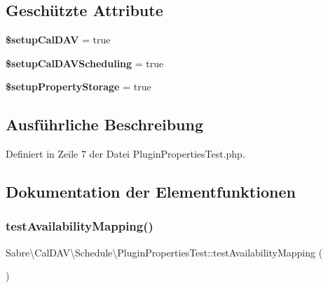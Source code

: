 \subsection*{Geschützte Attribute}
\begin{DoxyCompactItemize}
\item 
\mbox{\label{class_sabre_1_1_cal_d_a_v_1_1_schedule_1_1_plugin_properties_test_a51eddfe2a0409e71af29e128dad1fa5b}} 
{\bfseries \$setup\+Cal\+D\+AV} = true
\item 
\mbox{\label{class_sabre_1_1_cal_d_a_v_1_1_schedule_1_1_plugin_properties_test_aa7ab9b28515e3b29f2eab1a0b3331f0e}} 
{\bfseries \$setup\+Cal\+D\+A\+V\+Scheduling} = true
\item 
\mbox{\label{class_sabre_1_1_cal_d_a_v_1_1_schedule_1_1_plugin_properties_test_a93b204ca023df0179e0528837f03621a}} 
{\bfseries \$setup\+Property\+Storage} = true
\end{DoxyCompactItemize}


\subsection{Ausführliche Beschreibung}


Definiert in Zeile 7 der Datei Plugin\+Properties\+Test.\+php.



\subsection{Dokumentation der Elementfunktionen}
\mbox{\label{class_sabre_1_1_cal_d_a_v_1_1_schedule_1_1_plugin_properties_test_a33bcdfb57f3cdffd69d302105f4c549e}} 
\subsubsection{\texorpdfstring{test\+Availability\+Mapping()}{testAvailabilityMapping()}}
{\footnotesize\ttfamily Sabre\textbackslash{}\+Cal\+D\+A\+V\textbackslash{}\+Schedule\textbackslash{}\+Plugin\+Properties\+Test\+::test\+Availability\+Mapping (\begin{DoxyParamCaption}{ }\end{DoxyParamCaption})}

